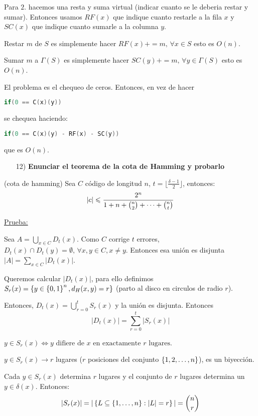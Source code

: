 \documentclass[12pt,a4paper]{article}
\begin{document}
Para $2.$ hacemos una resta y suma virtual (indicar cuanto se le deberia restar y sumar). 
Entonces usamos $RF(x)$ que indique cuanto restarle a la fila $x$ y $SC(x)$ que indique 
cuanto sumarle a la columna $y$.
\medskip

Restar $m$ de $S$ es simplemente hacer $RF(x) += m,\, \forall x\in S$ esto es $O(n)$.

Sumar $m$ a $\Gamma(S)$ es simplemente hacer $SC(y) += m,\, \forall y\in \Gamma(S)$ esto es $O(n)$.
\medskip

El problema es el chequeo de ceros. Entonces, en vez de hacer
\begin{lstlisting}[language=C]
    if(0 == C(x)(y))
\end{lstlisting}

se chequea haciendo:
\begin{lstlisting}[language=C]
    if(0 == C(x)(y) - RF(x) - SC(y))
\end{lstlisting}
que es $O(n)$.

\begin{itemize}
    \item [12)] \textbf{Enunciar el teorema de la cota de Hamming y probarlo}
    \label{dem:hamming}
\end{itemize}
\begin{teorema} (cota de hamming) Sea $C$ código de longitud $n$, $t = \lfloor \frac{\delta -1}{2} \rfloor$, entonces:
    $$|c| \leqslant \frac{2^{n}}{1+n+ \binom{n}{2} + \cdots + \binom{n}{t}}$$
\end{teorema}
\underline{Prueba:}

Sea $A = \bigcup_{x\in C} D_{t}(x)$. Como $C$ corrige $t$ errores, 
$D_{t}(x) \cap D_{t}(y) = \emptyset,\, \forall x,y\in C, x\neq y$. Entonces esa 
unión es disjunta $|A| = \sum_{x\in C} |D_{t}(x)|$.
\medskip

Queremos calcular $|D_{t}(x)|$, para ello definimos $S_{r}(x) = \left\lbrace y\in \left\lbrace 0,1 \right\rbrace^{n}, d_{H}(x,y)=r \right\rbrace$ 
(parto al disco en circulos de radio $r$).
\medskip

Entonces, $D_{t}(x) = \bigcup_{r=0}^{t} S_{r}(x)$ y la unión es disjunta. Entonces
$$|D_{t}(x)| = \sum_{r=0}^{t} |S_{r}(x)|$$

$y\in S_{r}(x) \iff y\,\, \text{difiere de $x$ en exactamente $r$ lugares}$.
\medskip

$y\in S_{r}(x) \to r$ lugares ($r$ posiciones del conjunto $\left\lbrace 1,2, \ldots, n \right\rbrace$), 
es un biyección.
\medskip

Cada $y\in S_{r}(x)$ determina $r$ lugares y el conjunto de $r$ lugares determina 
un $y\in \delta(x)$. Entonces:
$$|S_{r}(x)| = |\left\lbrace L \subseteq \left\lbrace 1,\ldots,n \right\rbrace:|L|=r \right\rbrace| = \binom{n}{r}$$
\end{document}
